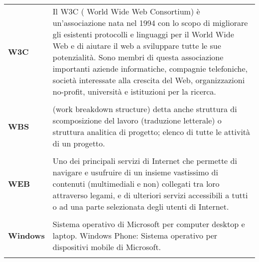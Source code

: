 \begin{longtable}{L{4cm} p{10cm}}
\textbf{W3C} & Il W3C ( World Wide Web Consortium) è un’associazione nata nel 1994 con lo scopo di migliorare gli esistenti protocolli e linguaggi per il World Wide Web e di aiutare il web a sviluppare tutte le sue potenzialità. Sono membri di questa associazione importanti aziende informatiche, compagnie telefoniche, società interessate alla crescita del Web, organizzazioni no-profit, università e istituzioni per la ricerca. \\ 
 \\ 
\textbf{WBS} & (work breakdown structure) detta anche struttura di scomposizione del lavoro (traduzione letterale) o struttura analitica di progetto; elenco di tutte le attività di un progetto. \\ 
 \\ 
\textbf{WEB} & Uno dei principali servizi di Internet che permette di navigare e usufruire di un insieme vastissimo di contenuti (multimediali e non) collegati tra loro attraverso legami, e di ulteriori servizi accessibili a tutti o ad una parte selezionata degli utenti di Internet. \\ 
 \\ 
\textbf{Windows} & Sistema operativo di Microsoft per computer desktop e laptop. Windows Phone: Sistema operativo per dispositivi mobile di Microsoft. \\ 
 \\ 
\end{longtable} 
 